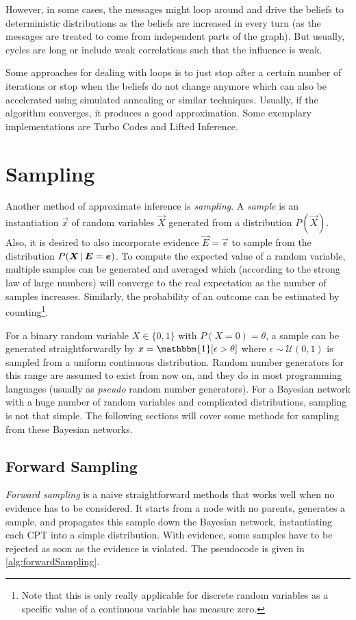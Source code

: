 			However, in some cases, the messages might loop around and drive the beliefs to deterministic distributions as the beliefs are increased in every turn (as the messages are treated to come from independent parts of the graph). But usually, cycles are long or include weak correlations such that the influence is weak.

			Some approaches for dealing with loops is to just stop after a certain number of iterations or stop when the beliefs do not change anymore which can also be accelerated using simulated annealing or similar techniques. Usually, if the algorithm converges, it produces a good approximation. Some exemplary implementations are Turbo Codes and Lifted Inference.

	\section{Sampling}
		Another method of approximate inference is \emph{sampling}. A \emph{sample} is an instantiation \(\vec{x}\) of random variables \(\vec{X}\) generated from a distribution \(P(\vec{X})\). Also, it is desired to also incorporate evidence \(\vec{E} = \vec{e}\) to sample from the distribution \( P(\bm{X} \,\vert\, \bm{E} = \bm{e}) \). To compute the expected value of a random variable, multiple samples can be generated and averaged which (according to the strong law of large numbers) will converge to the real expectation as the number of samples increases. Similarly, the probability of an outcome can be estimated by counting\footnote{Note that this is only really applicable for discrete random variables as a specific value of a continuous variable has measure zero.}.

		For a binary random variable \( X \in \{ 0, 1 \} \) with \( P(X = 0) = \theta \), a sample can be generated straightforwardly by \( x = \mathbbm{1}[\epsilon > \theta] \) where \( \epsilon \sim \mathcal{U}(0, 1) \) is sampled from a uniform continuous distribution. Random number generators for this range are assumed to exist from now on, and they do in most programming languages (usually as \emph{pseudo} random number generators). For a Bayesian network with a huge number of random variables and complicated distributions, sampling is not that simple. The following sections will cover some methods for sampling from these Bayesian networks.

		\subsection{Forward Sampling}
			\emph{Forward sampling} is a naive straightforward methods that works well when no evidence has to be considered. It starts from a node with no parents, generates a sample, and propagates this sample down the Bayesian network, instantiating each CPT into a simple distribution. With evidence, some samples have to be rejected as soon as the evidence is violated. The pseudocode is given in \autoref{alg:forwardSampling}.

